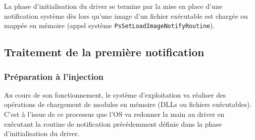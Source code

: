 La phase d'initialisation du driver se termine par la mise en place d'une notification système dès lors qu'une image d'un fichier exécutable est chargée ou mappée en mémoire (appel système \texttt{PsSetLoadImageNotifyRoutine}).


% 


\subsection{Traitement de la première notification}
\subsubsection{Préparation à l'injection}
Au cours de son fonctionnement, le système d'exploitation va réaliser des opérations de chargement de modules en mémoire (DLLs ou fichiers exécutables). C'est à l'issue de ce processus que l'OS va redonner la main au driver en exécutant la routine de notification précédemment définie dans la phase d'initialisation du driver.   

